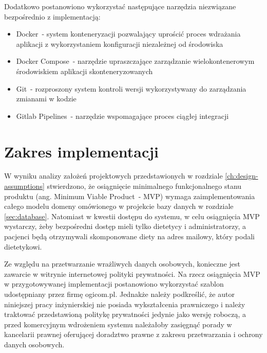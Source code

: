 \par
Dodatkowo postanowiono wykorzystać następujące narzędzia niezwiązane bezpośrednio z implementacją:
\begin{itemize}
    \item Docker\cite{tech:docker}~- system konteneryzacji pozwalający uprościć proces wdrażania aplikacji z wykorzystaniem konfiguracji niezależnej od środowiska
    \item Docker Compose\cite{tech:docker-compose}~- narzędzie upraszczające zarządzanie wielokontenerowym środowiskiem aplikacji skonteneryzowanych
    \item Git\cite{tech:git}~- rozproszony system kontroli wersji wykorzystywany do zarządzania zmianami w kodzie
    \item Gitlab Pipelines\cite{tech:gitlab-pipelines}~- narzędzie wspomagające proces ciągłej integracji
\end{itemize}

\section{Zakres implementacji}\label{sec:implementation-scope}

W wyniku analizy założeń projektowych przedstawionych w rozdziale \ref{ch:design-assumptions} stwierdzono,
że osiągnięcie minimalnego funkcjonalnego stanu produktu (ang. Minimum Viable Product~- MVP)
wymaga zaimplementowania całego modelu domeny omówionego w projekcie bazy danych w rozdziale \ref{sec:database}.
Natomiast w kwestii dostępu do systemu, w celu osiągnięcia MVP wystarczy, żeby bezpośredni dostęp mieli tylko dietetycy i administratorzy,
a pacjenci będą otrzymywali skomponowane diety na adres mailowy, który podali dietetykowi.

\par
Ze względu na przetwarzanie wrażliwych danych osobowych, konieczne jest zawarcie w witrynie internetowej polityki prywatności.
Na rzecz osiągnięcia MVP w przygotowywanej implementacji postanowiono wykorzystać szablon udostępniany przez firmę ogicom.pl\cite{url:ogicom-privacy-policy}.
Jednakże należy podkreślić, że autor niniejszej pracy inżynierskiej nie posiada wykształcenia prawniczego
i należy traktować przedstawioną politykę prywatności jedynie jako wersję roboczą,
a przed komercyjnym wdrożeniem systemu należałoby zasięgnąć porady w kancelarii prawnej oferującej doradztwo prawne z zakresu przetwarzania i ochrony danych osobowych.

